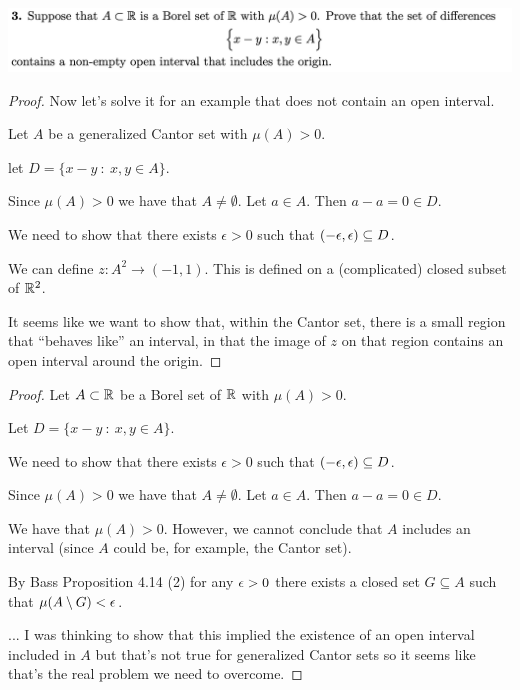 \newpage
\begin{mdframed}
\includegraphics[width=400pt]{img/analysis--berkeley-202a-hw05-ad8b.png}
\end{mdframed}


\begin{proof}
  Now let's solve it for an example that does not contain an open interval.

  Let $A$ be a generalized Cantor set with $\mu(A) > 0$.

  let $D = \big\{ x - y ~:~ x, y \in A\big\}$.

  Since $\mu(A) > 0$ we have that $A \neq \emptyset$. Let $a \in A$. Then $a - a = 0 \in D$.

  We need to show that there exists $\epsilon > 0$ such that $(-\epsilon, \epsilon) \subseteq D$.

  We can define $z: A^2 \to (-1, 1)$. This is defined on a (complicated) closed subset of $\mathbb{R}^2$.

  It seems like we want to show that, within the Cantor set, there is a small region that ``behaves like​'' an
  interval, in that the image of $z$ on that region contains an open interval around the origin.
\end{proof}


\begin{proof}
  Let $A \subset \mathbb{R}$ be a Borel set of $\mathbb{R}$ with $\mu(A) > 0$.

  Let $D = \big\{ x - y ~:~ x, y \in A\big\}$.

  We need to show that there exists $\epsilon > 0$ such that $(-\epsilon, \epsilon) \subseteq D$.

  Since $\mu(A) > 0$ we have that $A \neq \emptyset$. Let $a \in A$. Then $a - a = 0 \in D$.

  We have that $\mu(A) > 0$. However, we cannot conclude that $A$ includes an interval (since $A$ could be, for
  example, the Cantor set).

  By Bass Proposition 4.14 (2) for any $\epsilon > 0$ there exists a closed set $G \subseteq A$ such that $\mu(A \setminus G) < \epsilon$.

  ... I was thinking to show that this implied the existence of an open interval included in $A$ but that's not
  true for generalized Cantor sets so it seems like that's the real problem we need to overcome.
\end{proof}


